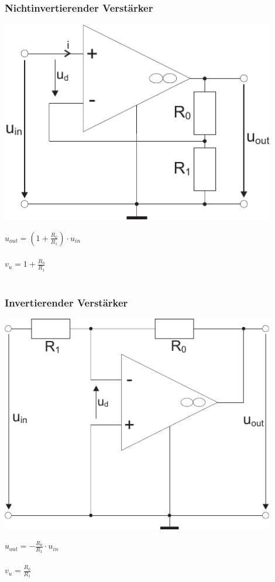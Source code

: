 \documentclass[a4paper,twocolumn,10pt]{article}
\begin{document}
\subsubsection*{Nichtinvertierender Verstärker}
\begin{minipage}[b]{0.3\textwidth}
\includegraphics[width=0.9\textwidth]{Grafiken/OP_NiV}
\end{minipage}
\hfill
\begin{minipage}[b]{0.16\textwidth}
$u_{out}=(1+\frac{R_0}{R_1})\cdot u_{in}$\\\\
$v_u=1+\frac{R_0}{R_1}$\\\\
\end{minipage}

\subsubsection*{Invertierender Verstärker}
\begin{minipage}[b]{0.3\textwidth}
\includegraphics[width=0.9\textwidth]{Grafiken/OP_IV}
\end{minipage}
\hfill
\begin{minipage}[b]{0.16\textwidth}
$u_{out}=-\frac{R_0}{R_1}\cdot u_{in}$\\\\
$v_u=\frac{R_0}{R_1}$\\\\
\end{minipage}
\end{document}
